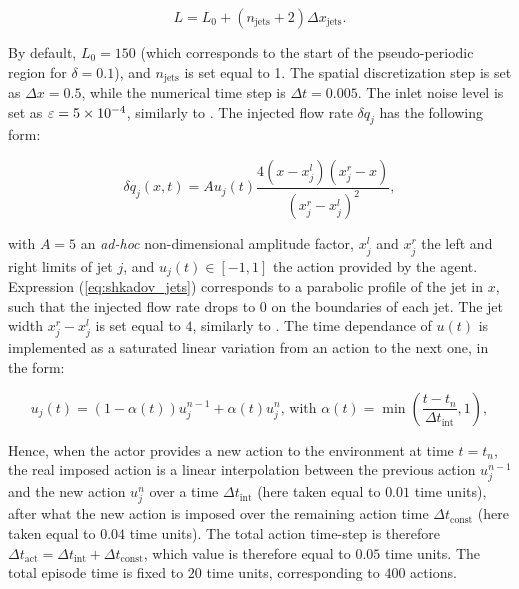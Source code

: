 \begin{equation}
	L = L_0 + \left( n_\text{jets} + 2\right) \Delta x_\text{jets}.
\end{equation}

By default, $L_0 = 150$ (which corresponds to the start of the pseudo-periodic region for $\delta = 0.1$), and $n_\text{jets}$ is set equal to 1. The spatial discretization step is set as $\Delta x = 0.5$, while the numerical time step is $\Delta t = 0.005$. The inlet noise level is set as $\varepsilon = \num{5e-4}$, similarly to \cite{belus2019}. The injected flow rate $\delta q_j$ has the following form:

\begin{equation}
\label{eq:shkadov_jets}
	\delta q_j (x,t) = A u_j(t) \frac{4 \left( x - x_j^l \right) \left( x_j^r - x \right)}{ \left( x_j^r - x_j^l \right)^2},
\end{equation}

with $A=5$ an \textit{ad-hoc} non-dimensional amplitude factor, $x_j^l$ and $x_j^r$ the left and right limits of jet $j$, and $u_j(t) \in [-1,1]$ the action provided by the agent. Expression (\ref{eq:shkadov_jets}) corresponds to a parabolic profile of the jet in $x$, such that the injected flow rate drops to $0$ on the boundaries of each jet. The jet width $x_j^r - x_j^l$ is set equal to $4$, similarly to \cite{belus2019}. The time dependance of $u(t)$ is implemented as a saturated linear variation from an action to the next one, in the form:

\begin{equation}
\label{eq:shkadov_actions}
	u_j(t) = (1-\alpha(t)) u_j^{n-1} + \alpha(t) u_j^n \text{, with } \alpha(t) = \min \left( \frac{t-t_n}{\Delta t_\text{int}}, 1 \right),
\end{equation}

Hence, when the actor provides a new action to the environment at time $t=t_n$, the real imposed action is a linear interpolation between the previous action $u_j^{n-1}$ and the new action $u_j^n$ over a time $\Delta t_\text{int}$ (here taken equal to $0.01$ time units), after what the new action is imposed over the remaining action time $\Delta t_\text{const}$ (here taken equal to $0.04$ time units). The total action time-step is therefore $\Delta t_\text{act} = \Delta t_\text{int} + \Delta t_\text{const}$, which value is therefore equal to $0.05$ time units. The total episode time is fixed to $20$ time units, corresponding to $400$ actions.

%

